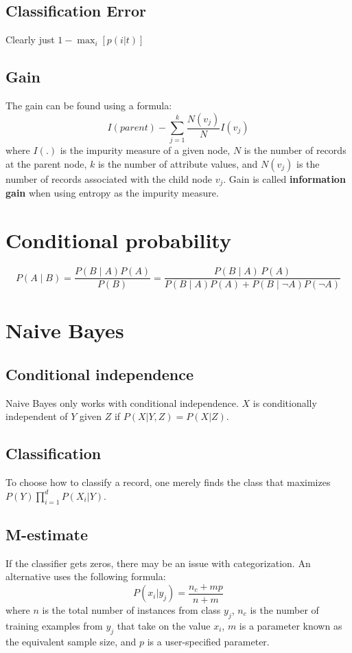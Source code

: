\documentclass[12pt]{amsart}
\begin{document}
\subsection{Classification Error}
Clearly just $1-\max_i [p(i|t)]$

\subsection{Gain}
The gain can be found using a formula:
\begin{equation*}
I(parent) - \sum_{j=1}^k \frac{N(v_j)}{N} I(v_j)
\end{equation*}
where $I(.)$ is the impurity measure of a given node, $N$ is the number of records at the parent node, $k$ is the number of attribute values, and $N(v_j)$ is the number of records associated with the child node $v_j$.
Gain is called \textbf{information gain} when using entropy as the impurity measure.


\section{Conditional probability}

\begin{equation*}
 P(A\mid B)=\frac{P(B\mid A)P(A)}{P(B)} = \frac{P(B\mid A)\,P(A)}{P(B\mid A)P(A)+P(B\mid \neg A)P(\neg A)} 
\end{equation*}

\section{Naive Bayes}

\subsection{Conditional independence}
Naive Bayes only works with conditional independence. $X$ is conditionally independent of $Y$ given $Z$ if $P(X | Y, Z) = P(X | Z)$.

\subsection{Classification}
To choose how to classify a record, one merely finds the class that maximizes $P(Y) \prod_{i=1}^d P(X_i |Y)$.

\subsection{M-estimate}
If the classifier gets zeros, there may be an issue with categorization. An alternative uses the following formula:
\begin{equation*}
P(x_i | y_j) = \frac{n_c + mp}{n + m}
\end{equation*}
where $n$ is the total number of instances from class $y_j$, $n_c$ is the number of training examples from $y_j$ that take on the value $x_i$, $m$ is a parameter known as the equivalent sample size, and $p$ is a user-specified parameter. 
\end{document}
